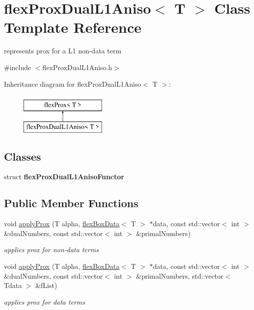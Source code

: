 \hypertarget{classflex_prox_dual_l1_aniso}{}\section{flex\+Prox\+Dual\+L1\+Aniso$<$ T $>$ Class Template Reference}
\label{classflex_prox_dual_l1_aniso}


represents prox for a L1 non-\/data term  




{\ttfamily \#include $<$flex\+Prox\+Dual\+L1\+Aniso.\+h$>$}

Inheritance diagram for flex\+Prox\+Dual\+L1\+Aniso$<$ T $>$\+:\begin{figure}[H]
\begin{center}
\leavevmode
\includegraphics[height=2.000000cm]{classflex_prox_dual_l1_aniso}
\end{center}
\end{figure}
\subsection*{Classes}
\begin{DoxyCompactItemize}
\item 
struct {\bfseries flex\+Prox\+Dual\+L1\+Aniso\+Functor}
\end{DoxyCompactItemize}
\subsection*{Public Member Functions}
\begin{DoxyCompactItemize}
\item 
void \hyperlink{classflex_prox_dual_l1_aniso_afef01f75247ba5a8990c5b77a7ab89f0}{apply\+Prox} (T alpha, \hyperlink{classflex_box_data}{flex\+Box\+Data}$<$ T $>$ $\ast$data, const std\+::vector$<$ int $>$ \&dual\+Numbers, const std\+::vector$<$ int $>$ \&primal\+Numbers)
\begin{DoxyCompactList}\small\item\em applies prox for non-\/data terms \end{DoxyCompactList}\item 
void \hyperlink{classflex_prox_dual_l1_aniso_aff8e46fb892387898d54516f0df3c080}{apply\+Prox} (T alpha, \hyperlink{classflex_box_data}{flex\+Box\+Data}$<$ T $>$ $\ast$data, const std\+::vector$<$ int $>$ \&dual\+Numbers, const std\+::vector$<$ int $>$ \&primal\+Numbers, std\+::vector$<$ Tdata $>$ \&f\+List)
\begin{DoxyCompactList}\small\item\em applies prox for data terms \end{DoxyCompactList}\end{DoxyCompactItemize}
